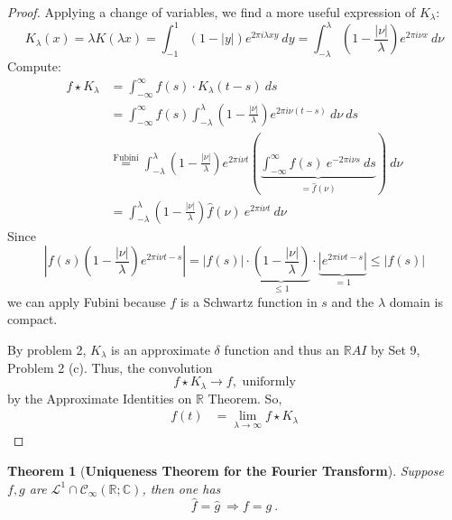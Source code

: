 \documentclass[12pt, reqno]{amsart}
\newtheorem{theorem}{Theorem}[section]
\theoremstyle{definition}
\theoremstyle{remark}
\begin{document}
\begin{itemize}
\begin{itemize}
\begin{proof}
    Applying a change of variables, we find a more useful expression of $K_{\lambda}$: $$
K_{\lambda}(x)=\lambda K(\lambda x)=\int_{-1}^{1}(1-|y|)e^{2\pi i \lambda xy}\ dy=\int_{-\lambda}^{\lambda}\left(1- \frac{|\nu|}{\lambda}\right)e^{2\pi i \nu x}\ d \nu
$$
Compute:
\begin{align*}
f\star K_{\lambda}&= \int_{-\infty}^{\infty}f(s)\cdot K_{\lambda}(t-s)\ ds\\
&= \int_{-\infty}^{\infty}f(s)\int_{-\lambda}^{\lambda} \left(1- \frac{|\nu|}{\lambda}\right)e^{2\pi i \nu (t-s)}\ d \nu\ ds\\
&\overset{\text{Fubini}}{=} \int_{-\lambda}^{\lambda} \left(1- \frac{|\nu|}{\lambda}\right)e^{2\pi i \nu t} \left(\underbrace{\int_{-\infty}^{\infty}f(s)~e^{-2\pi i \nu s}\ ds}_{=\widehat f(\nu)}\right)\ d \nu\\
&= \int_{-\lambda}^{\lambda} \left(1- \frac{|\nu|}{\lambda}\right)\widehat f(\nu)~e^{2\pi i \nu t}\ d \nu
\end{align*}
Since $$\left|f(s) \left(1- \frac{|\nu|}{\lambda}\right) e^{2\pi i \nu t-s}\right|=\left|f(s)\right|\cdot \underbrace{\left(1- \frac{|\nu|}{\lambda}\right)}_{\le1}\cdot\underbrace{\left| e^{2\pi i \nu t-s}\right|}_{=1}\le |f(s)|$$
we can apply Fubini because $f$ is a Schwartz function in $s$ and the $\lambda$ domain is compact. 

\vspace*{10 pt}

By problem 2, $K_{\lambda}$ is an approximate $\delta$ function and thus an $\mathbb{R}AI$ by Set 9, Problem 2 (c). Thus, the convolution $$
f\star K_{\lambda}\rightarrow f,\text{ uniformly}
$$
by the Approximate Identities on $\mathbb{R}$ Theorem. So, \begin{align*}
f(t)&= \lim_{\lambda \rightarrow \infty} f\star K_{\lambda}
\end{align*}
\end{proof}

\begin{theorem}[{\bf{Uniqueness Theorem for the Fourier Transform}}]  \label{thm_uniqueness}
    Suppose $f,g$ are $\mathcal{L}^1 \cap\mathcal{C}_\infty(\mathbb{R}; \mathbb{C})$, then one has
    \begin{equation*}
    \widehat{f} = \widehat{g} ~\Rightarrow f = g ~\mbox{.}
    \end{equation*}
\end{theorem}


\end{itemize}
\end{itemize}
\end{document}
